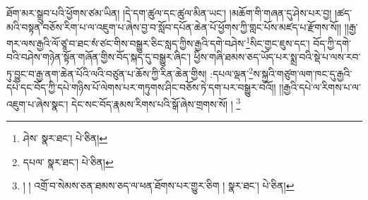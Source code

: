 ཐོག་མར་སྒྲུབ་པའི་ཕྱོགས་ཙམ་ཡིན། །དེ་དག་ཚུལ་དང་ཚུལ་མིན་ཡང་། །མཆོག་གི་གཞན་དུ་ཤེས་པར་བྱ། །ཚད་མའི་བསྟན་བཅོས་རིག་པ་ལ་འཇུག་པ་ཞེས་བྱ་བ་སློབ་དཔོན་ཆེན་པོ་ཕྱོགས་ཀྱི་གླང་པོས་མཛད་པ་རྫོགས་སོ།། །།རྒྱ་གར་ལས་རྒྱའི་ལོ་ཙཱ་བ་ཐང་སཾ་ཙང་གིས་བསྒྱུར་ཅིང་སླད་ཀྱིས་རྒྱའི་དགེ་བཤེས་\footnote{ཤེས་  སྣར་ཐང་།  པེ་ཅིན། }སིང་གྱང་ཇུས་དང་། བོད་ཀྱི་དགེ་བའི་བཤེས་གཉེན་སྟོན་གཞོན་གྱིས་བོད་སྐད་དུ་བསྒྱུར་ཞིང་། ཕྱིས་གཞི་ཐམས་ཅད་ཡོད་པར་སྨྲ་བའི་སྡེ་པ་ལས་རབ་ཏུ་བྱུང་བ་རྒྱ་ནག་ཆེན་པོའི་ལའི་བཙུན་པ་ཆོས་ཀྱི་རིན་ཆེན་གྱིས། :དཔལ་ལྡན་\footnote{དཔལ་  སྣར་ཐང་།  པེ་ཅིན། }ས་སྐྱའི་གཙུག་ལག་ཁང་དུ་རྒྱའི་དཔེ་དང་བོད་ཀྱི་དཔེ་གཉིས་པོ་ལེགས་པར་གཏུགས་ཤིང་བཅོས་ཏེ་དག་པར་བསྒྱུར་བའོ།། །།རྒྱའི་དཔེ་ལ་རིགས་པ་ལ་འཇུག་པ་ཞེས་སྣང་། དེང་སང་བོད་རྣམས་རིགས་པའི་སྒོ་ཞེས་གྲགས་སོ། ། \footnote{། ། འགྲོ་བ་སེམས་ཅན་ཐམས་ཅད་ལ་ཕན་ཐོགས་པར་གྱུར་ཅིག །  སྣར་ཐང་།  པེ་ཅིན། }
